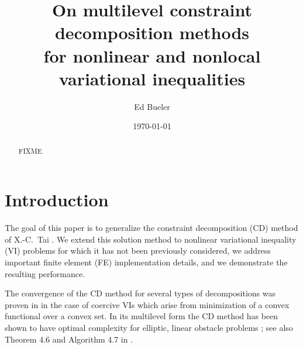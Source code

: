 \documentclass[letterpaper,final,12pt,reqno]{amsart}
\theoremstyle{cstyle}
\theoremstyle{dstyle}
\numberwithin{equation}{section}
\numberwithin{figure}{section}
\numberwithin{table}{section}
\numberwithin{theorem}{section}
\begin{document}
\title[On MCD methods for nonlinear and nonlocal VIs]{On multilevel constraint decomposition methods \\ for nonlinear and nonlocal variational inequalities}

\author{Ed Bueler}

\date{\today}

\begin{abstract} FIXME
\end{abstract}

\maketitle


\thispagestyle{empty}

\section{Introduction} \label{sec:intro}

The goal of this paper is to generalize the constraint decomposition (CD) method of X.-C.~Tai \cite{Tai2003}.  We extend this solution method to nonlinear variational inequality (VI) problems for which it has not been previously considered, we address important finite element (FE) implementation details, and we demonstrate the resulting performance.

The convergence of the CD method for several types of decompositions was proven in \cite{Tai2003} in the case of coercive VIs which arise from minimization of a convex functional over a convex set.  In its multilevel form the CD method has been shown to have optimal complexity for elliptic, linear obstacle problems \cite[subsection 5.4]{Tai2003}; see also Theorem 4.6 and Algorithm 4.7 in \cite{GraeserKornhuber2009}.
\end{document}
